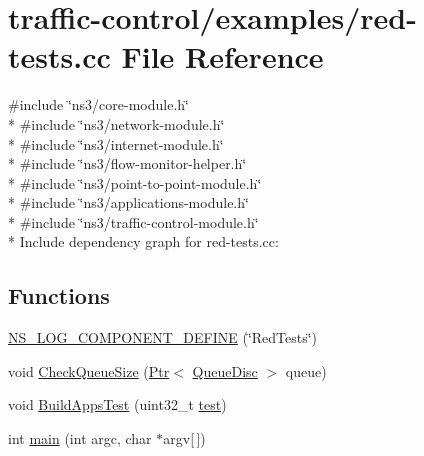 \hypertarget{red-tests_8cc}{}\section{traffic-\/control/examples/red-\/tests.cc File Reference}
\label{red-tests_8cc}
{\ttfamily \#include \char`\"{}ns3/core-\/module.\+h\char`\"{}}\\*
{\ttfamily \#include \char`\"{}ns3/network-\/module.\+h\char`\"{}}\\*
{\ttfamily \#include \char`\"{}ns3/internet-\/module.\+h\char`\"{}}\\*
{\ttfamily \#include \char`\"{}ns3/flow-\/monitor-\/helper.\+h\char`\"{}}\\*
{\ttfamily \#include \char`\"{}ns3/point-\/to-\/point-\/module.\+h\char`\"{}}\\*
{\ttfamily \#include \char`\"{}ns3/applications-\/module.\+h\char`\"{}}\\*
{\ttfamily \#include \char`\"{}ns3/traffic-\/control-\/module.\+h\char`\"{}}\\*
Include dependency graph for red-\/tests.cc\+:
\subsection*{Functions}
\begin{DoxyCompactItemize}
\item 
\hyperlink{red-tests_8cc_ae8add266996c69b049d07f9b5bd45579}{N\+S\+\_\+\+L\+O\+G\+\_\+\+C\+O\+M\+P\+O\+N\+E\+N\+T\+\_\+\+D\+E\+F\+I\+NE} (\char`\"{}Red\+Tests\char`\"{})
\item 
void \hyperlink{red-tests_8cc_a985cd669fb2da97dadbfe6b12930df10}{Check\+Queue\+Size} (\hyperlink{classns3_1_1Ptr}{Ptr}$<$ \hyperlink{classns3_1_1QueueDisc}{Queue\+Disc} $>$ queue)
\item 
void \hyperlink{red-tests_8cc_a10c553e45f82b05b5cb70aaa433308b0}{Build\+Apps\+Test} (uint32\+\_\+t \hyperlink{main-test-sync_8cc_a708a4c1a4d0c4acc4c447310dd4db27f}{test})
\item 
int \hyperlink{red-tests_8cc_a0ddf1224851353fc92bfbff6f499fa97}{main} (int argc, char $\ast$argv\mbox{[}$\,$\mbox{]})
\end{DoxyCompactItemize}
